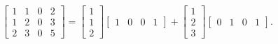 \documentclass[11pt,a4paper,openany,oneside]{book}
\numberwithin{equation}{chapter}
\begin{document}
\[
\begin{bmatrix} 1 & 1 & 0 & 2 \\ 1 & 2 & 0 & 3 \\ 2 & 3 & 0 & 5 \end{bmatrix} = \begin{bmatrix} 1 \\ 1 \\ 2 \end{bmatrix}\begin{bmatrix} 1 & 0 & 0 & 1 \end{bmatrix} + \begin{bmatrix} 1 \\ 2 \\ 3 \end{bmatrix}\begin{bmatrix} 0 & 1 & 0 & 1 \end{bmatrix}.
\]
\end{document}
